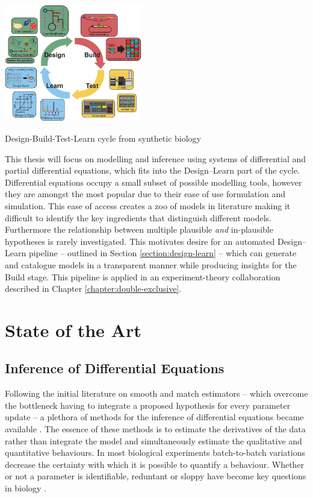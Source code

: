 \begin{Figure}
    \includegraphics[width=60mm]{figures/dbtl.png}
    \caption{Design-Build-Test-Learn cycle from synthetic biology}
    \label{fig:dbtl}
\end{Figure}
\noindent
This thesis will focus on modelling and inference using systems of differential
and partial differential equations, which fits into the Design--Learn part of
the cycle. Differential equations occupy a small subset of possible modelling tools,
however they are amongst the most popular due to their ease of use formulation
and simulation. This ease of access creates a zoo of models in literature making
it difficult to identify the key ingredients that distinguish different models.
Furthermore the relationship between multiple plausible \textit{and} in-plausible hypotheses
is rarely investigated. This motivates desire for an automated Design--Learn pipeline --
outlined in Section \ref{section:design-learn} -- which can generate and catalogue models
in a transparent manner while producing insights for the Build stage.
This pipeline is applied in an experiment-theory collaboration described in
Chapter \ref{chapter:double-exclusive}.

\section{State of the Art}
\label{section:geometry}
\subsection{Inference of Differential Equations}
Following the initial literature on smooth and match estimators
\cite{Gugushvili2012Smoothing} -- which overcome the bottleneck
having to integrate a proposed hypothesis for every parameter update --
a plethora of methods for the inference of differential equations
became available \cite{Brunton2016SparseSINDYc,GorbachScalableSystems}.
The essence of these methods is to estimate the derivatives of the
data rather than integrate the model and simultaneously estimate 
the qualitative and quantitative behaviours. In most biological
experiments batch-to-batch variations decrease the certainty
with which it is possible to quantify a behaviour. Whether or not
a parameter is identifiable, reduntant or sloppy have become
key questions in biology \cite{Chis2016OnIdentifiability,
Gabor2017ParameterBiosystems,Villaverde2016StructuralModels}.

